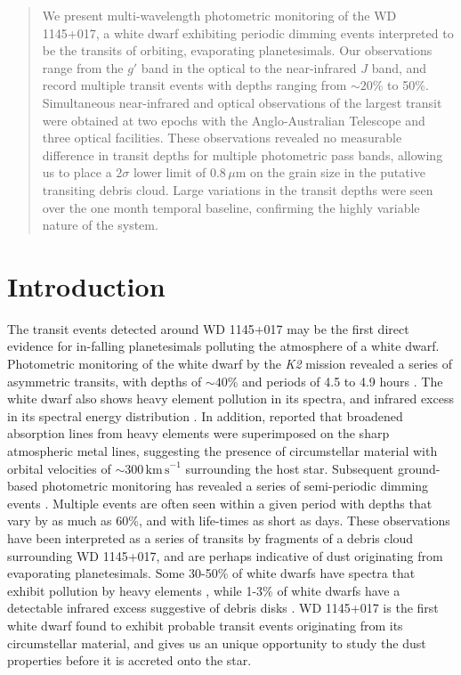 \documentclass[apj]{emulateapj}
\begin{document}
\begin{abstract}
We present multi-wavelength photometric monitoring of the WD 1145+017, a white dwarf exhibiting periodic dimming events interpreted to be the transits of orbiting, evaporating planetesimals. Our observations range from the $g'$ band in the optical to the near-infrared $J$ band, and record multiple transit events with depths ranging from $\sim 20$\% to 50\%. Simultaneous near-infrared and optical observations of the largest transit were obtained at two epochs with the Anglo-Australian Telescope and three optical facilities. These observations revealed no measurable difference in transit depths for multiple photometric pass bands, allowing us to place a $2\sigma$ lower limit of $0.8\,\mu\mathrm{m}$ on the grain size in the putative transiting debris cloud. Large variations in the transit depths were seen over the one month temporal baseline, confirming the highly variable nature of the system. 
\end{abstract}


\section{Introduction}
\label{sec:introduction}

The transit events detected around WD 1145+017 may be the first direct evidence for in-falling planetesimals polluting the atmosphere of a white dwarf. Photometric monitoring of the white dwarf by the \emph{K2} mission revealed a series of asymmetric transits, with depths of $\sim 40$\% and periods of 4.5 to 4.9 hours \citep{2015Natur.526..546V}. The white dwarf also shows heavy element pollution in its spectra, and infrared excess in its spectral energy distribution \citep{2015Natur.526..546V,2016ApJ...816L..22X}. In addition, \citet{2016ApJ...816L..22X} reported that broadened absorption lines from heavy elements were superimposed on the sharp atmospheric metal lines, suggesting the presence of circumstellar material with orbital velocities of $\sim 300\,\mathrm{km\,s}^{-1}$ surrounding the host star. Subsequent ground-based photometric monitoring has revealed a series of semi-periodic dimming events \citep{2015Natur.526..546V,2015arXiv151006434C,2016ApJ...818L...7G,2016MNRAS.tmp..406R,2016arXiv160308823A}. Multiple events are often seen within a given period with depths that vary by as much as 60\%, and with life-times as short as days. These observations have been interpreted as a series of transits by fragments of a debris cloud surrounding WD 1145+017, and are perhaps indicative of dust originating from evaporating planetesimals. Some 30-50\% of white dwarfs have spectra that exhibit pollution by heavy elements \citep[e.g.][]{2003ApJ...596..477Z,2010ApJ...722..725Z,2014A&A...566A..34K}, while 1-3\% of white dwarfs have a detectable infrared excess suggestive of debris disks \citep[e.g.][]{2003ApJ...584L..91J,2007ApJS..171..206M,2009ApJ...694..805F,2011MNRAS.417.1210G,2011ApJS..197...38D}. WD 1145+017 is the first white dwarf found to exhibit probable transit events originating from its circumstellar material, and gives us an unique opportunity to study the dust properties before it is accreted onto the star. 
\end{document}
